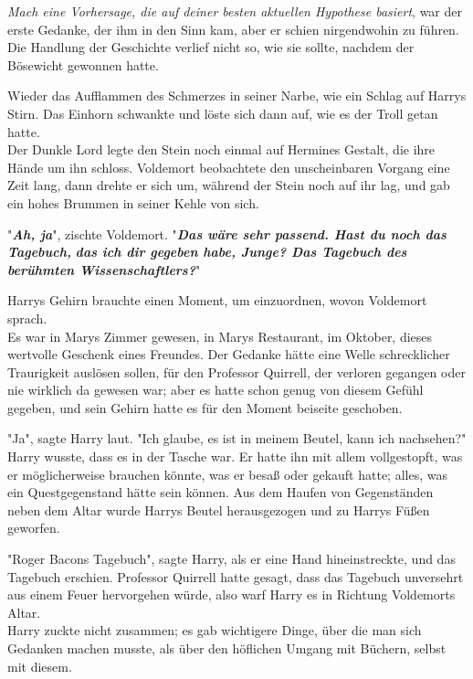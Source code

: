 {\emph{Mach eine Vorhersage, die auf deiner besten aktuellen Hypothese basiert}, war der erste Gedanke, der ihm in den Sinn kam, aber er schien nirgendwohin zu führen.\\ Die Handlung der Geschichte verlief nicht so, wie sie sollte, nachdem der Bösewicht gewonnen hatte.

Wieder das Aufflammen des Schmerzes in seiner Narbe, wie ein Schlag auf Harrys Stirn. Das Einhorn schwankte und löste sich dann auf, wie es der Troll getan hatte.\\ Der Dunkle Lord legte den Stein noch einmal auf Hermines Gestalt, die ihre Hände um ihn schloss. Voldemort beobachtete den unscheinbaren Vorgang eine Zeit lang, dann drehte er sich um, während der Stein noch auf ihr lag, und gab ein hohes Brummen in seiner Kehle von sich.

"\textbf{\emph{Ah, ja}}", zischte Voldemort. "\textbf{\emph{Das wäre sehr passend. Hast du noch das Tagebuch,}} \textbf{\emph{das ich dir gegeben habe, Junge? Das Tagebuch des berühmten Wissenschaftlers?}}"

Harrys Gehirn brauchte einen Moment, um einzuordnen, wovon Voldemort sprach.\\ Es war in Marys Zimmer gewesen, in Marys Restaurant, im Oktober, dieses wertvolle Geschenk eines Freundes. Der Gedanke hätte eine Welle schrecklicher Traurigkeit auslösen sollen, für den Professor Quirrell, der verloren gegangen oder nie wirklich da gewesen war; aber es hatte schon genug von diesem Gefühl gegeben, und sein Gehirn hatte es für den Moment beiseite geschoben.

"Ja", sagte Harry laut. "Ich glaube, es ist in meinem Beutel, kann ich nachsehen?"\\ Harry wusste, dass es in der Tasche war. Er hatte ihn mit allem vollgestopft, was er möglicherweise brauchen könnte, was er besaß oder gekauft hatte; alles, was ein Questgegenstand hätte sein können. Aus dem Haufen von Gegenständen neben dem Altar wurde Harrys Beutel herausgezogen und zu Harrys Füßen geworfen.

"Roger Bacons Tagebuch", sagte Harry, als er eine Hand hineinstreckte, und das Tagebuch erschien. Professor Quirrell hatte gesagt, dass das Tagebuch unversehrt aus einem Feuer hervorgehen würde, also warf Harry es in Richtung Voldemorts Altar.\\ Harry zuckte nicht zusammen; es gab wichtigere Dinge, über die man sich Gedanken machen musste, als über den höflichen Umgang mit Büchern, selbst mit diesem.

}
